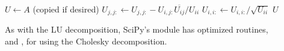 \begin{algorithm}[H]
\begin{algorithmic}[1]
\State $U \gets A$ (copied if desired)
        \State $U_{j,j:} \gets U_{j,j:} - U_{i,j:}\overline{U_{ij}}/U_{ii}$
    \EndFor
    \State $U_{i,i:} \gets U_{i,i:}/\sqrt{U_{ii}}$
\EndFor
\State {} $U$
\EndProcedure
\end{algorithmic}
\caption{}
\end{algorithm}

As with the LU decomposition, SciPy's  module has optimized routines,\\ and , for using the Cholesky decomposition.

